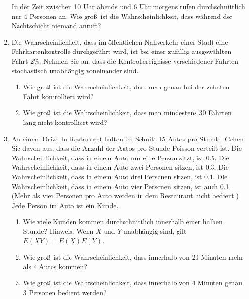 \begin{enumerate}
In der Zeit zwischen 10 Uhr abends und 6 Uhr morgens rufen durchschnittlich
nur 4 Personen an. Wie gro\ss\ ist die Wahrscheinlichkeit, dass w\"{a}hrend
der Nachtschicht niemand anruft?

\item Die Wahrscheinlichkeit, dass im \"{o}ffentlichen
Nahverkehr einer Stadt eine Fahrkartenkontrolle durchgef\"{u}hrt wird, ist
bei einer zuf\"{a}llig ausgew\"{a}hlten Fahrt 2\%. Nehmen Sie an, dass die
Kontrollereignisse verschiedener Fahrten stochastisch unabh\"{a}ngig
voneinander sind.
\begin{enumerate}
\item Wie gro\ss\ ist die Wahrscheinlichkeit, dass man genau bei der zehnten
Fahrt kontrolliert wird?
\item Wie gro\ss\ ist die Wahrscheinlichkeit, dass man mindestens 30 Fahrten
lang nicht kontrolliert wird?
\end{enumerate}

\item An einem Drive-In-Restaurant halten im Schnitt 15 Autos pro
Stunde. Gehen Sie davon aus, dass die Anzahl der Autos pro Stunde
Poisson-verteilt ist. Die Wahrscheinlichkeit, dass in einem Auto nur eine
Person sitzt, ist 0.5. Die Wahrscheinlichkeit, dass in einem Auto zwei
Personen sitzen, ist 0.3. Die Wahrscheinlichkeit, dass in einem Auto drei
Personen sitzen, ist 0.1. Die Wahrscheinlichkeit, dass in einem Auto vier
Personen sitzen, ist auch 0.1. (Mehr als vier Personen pro Auto werden in
dem Restaurant nicht bedient.) Jede Person im Auto ist ein Kunde.
\begin{enumerate}
\item Wie viele Kunden kommen durchschnittlich innerhalb einer halben
Stunde? Hinweis: Wenn $X$ und $Y$ unabh\"{a}ngig sind, gilt $E(XY)=E(X)E(Y)$.
\item Wie gro\ss\ ist die Wahrscheinlichkeit, dass innerhalb von 20 Minuten
mehr als 4 Autos kommen?
\item Wie gro\ss\ ist die Wahrscheinlichkeit, dass innerhalb von 4 Minuten
genau 3 Personen bedient werden?
\end{enumerate}
\end{enumerate}
